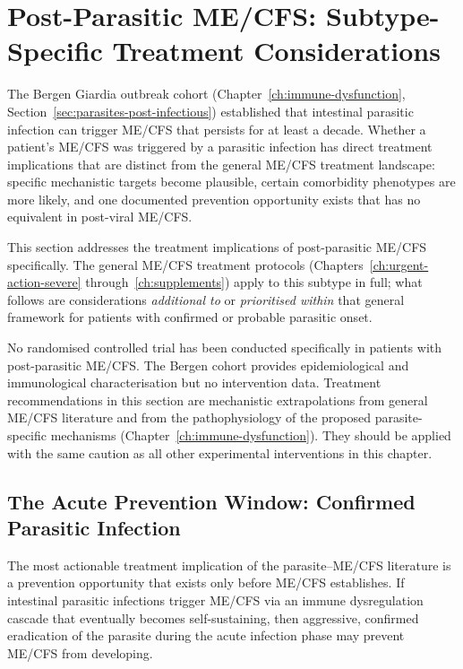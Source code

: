 \chapter{Post-Parasitic ME/CFS: Subtype-Specific Treatment Considerations}
\label{ch:post-parasitic-treatment}

The Bergen Giardia outbreak cohort (Chapter~\ref{ch:immune-dysfunction}, Section~\ref{sec:parasites-post-infectious}) established that intestinal parasitic infection can trigger ME/CFS that persists for at least a decade. Whether a patient's ME/CFS was triggered by a parasitic infection has direct treatment implications that are distinct from the general ME/CFS treatment landscape: specific mechanistic targets become plausible, certain comorbidity phenotypes are more likely, and one documented prevention opportunity exists that has no equivalent in post-viral ME/CFS.

This section addresses the treatment implications of post-parasitic ME/CFS specifically. The general ME/CFS treatment protocols (Chapters~\ref{ch:urgent-action-severe} through~\ref{ch:supplements}) apply to this subtype in full; what follows are considerations \emph{additional to} or \emph{prioritised within} that general framework for patients with confirmed or probable parasitic onset.

\begin{limitation}
\label{lim:post-parasitic-no-trials}
No randomised controlled trial has been conducted specifically in patients with post-parasitic ME/CFS. The Bergen cohort provides epidemiological and immunological characterisation but no intervention data. Treatment recommendations in this section are mechanistic extrapolations from general ME/CFS literature and from the pathophysiology of the proposed parasite-specific mechanisms (Chapter~\ref{ch:immune-dysfunction}). They should be applied with the same caution as all other experimental interventions in this chapter.
\end{limitation}

\section{The Acute Prevention Window: Confirmed Parasitic Infection}
\label{sec:parasite-prevention-window}

The most actionable treatment implication of the parasite--ME/CFS literature is a prevention opportunity that exists only before ME/CFS establishes. If intestinal parasitic infections trigger ME/CFS via an immune dysregulation cascade that eventually becomes self-sustaining, then aggressive, confirmed eradication of the parasite during the acute infection phase may prevent ME/CFS from developing.

